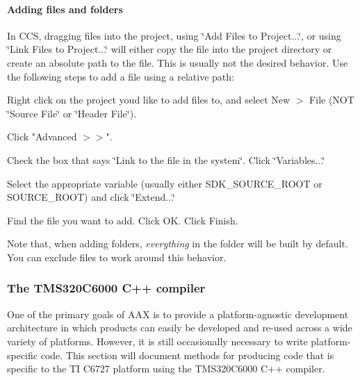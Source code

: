 \hypertarget{a00832_subsubsection__adding_files_and_folders_}{}\paragraph{Adding files and folders}\label{a00832_subsubsection__adding_files_and_folders_}
 In C\+CS, dragging files into the project, using \char`\"{}\+Add Files to Project...\char`\"{}, or using \char`\"{}\+Link Files to Project...\char`\"{} will either copy the file into the project directory or create an absolute path to the file. This is usually not the desired behavior. Use the following steps to add a file using a relative path\+: {\itshape  ~} 
\begin{DoxyEnumerate}
\item Right click on the project you\textquotesingle{}d like to add files to, and select New $>$ File (N\+OT \char`\"{}\+Source File\char`\"{} or \char`\"{}\+Header File\char`\"{}).  
\item Click "Advanced $>$$>$".  
\item Check the box that says \char`\"{}\+Link to the file in the system\char`\"{}. Click \char`\"{}\+Variables...\char`\"{}  
\item Select the appropriate variable (usually either {\ttfamily S\+D\+K\+\_\+\+S\+O\+U\+R\+C\+E\+\_\+\+R\+O\+OT} or {\ttfamily S\+O\+U\+R\+C\+E\+\_\+\+R\+O\+OT}) and click \char`\"{}\+Extend...\char`\"{}  
\item Find the file you want to add. Click OK. Click Finish.  
\end{DoxyEnumerate}

Note that, when adding folders, {\itshape everything} in the folder will be built by default. You can exclude files to work around this behavior.

\hypertarget{a00832_subsection__the_tms320c6000_cpp_compiler}{}\subsubsection{The T\+M\+S320\+C6000 C++ compiler}\label{a00832_subsection__the_tms320c6000_cpp_compiler}
 One of the primary goals of A\+AX is to provide a platform-\/agnostic development architecture in which products can easily be developed and re-\/used across a wide variety of platforms. However, it is still occasionally necessary to write platform-\/specific code. This section will document methods for producing code that is specific to the TI C6727 platform using the T\+M\+S320\+C6000 C++ compiler.

